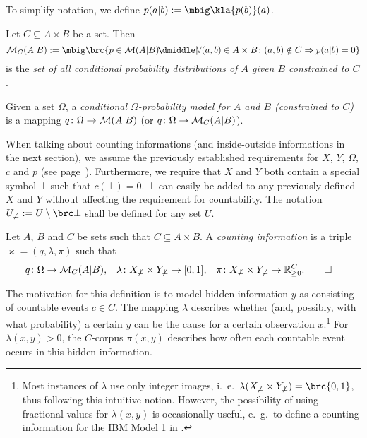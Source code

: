 To simplify notation, we define $p(a|b) := \mbig\kla{p(b)}(a)$.

\begin{definition}\label{def:02-cpd-restr}
 Let $C\subseteq A\times B$ be a set. Then
 \[
  \um_C(A|B) := \mbig\brc{p\in\um(A|B)\!\dmiddle|\! \forall (a,b)\in A\times B\colon (a,b)\notin C \Rightarrow p(a|b) = 0}
 \]
is the \emph{set of all conditional probability distributions of $A$ given $B$
 constrained to $C$}.
\end{definition}

\begin{definition}
 Given a set $\Omega$, a \emph{conditional $\Omega$-probability model for $A$
 and $B$ (constrained to $C$)} is a mapping $q\colon\Omega\to\mathcal M(A|B)$ (or
 $q\colon\Omega\to\mathcal M_C(A|B)$).
\end{definition}

When talking about counting informations (and inside-outside informations in
the next section), we assume the previously established requirements for $X$,
$Y$, $\Omega$, $c$ and $p$ (see page~\pageref{02-basic-requirements}).
Furthermore, we require that $X$ and $Y$ both contain a special symbol $\bot$
such that $c(\bot) = 0$. $\bot$ can easily be
added to any previously defined $X$ and $Y$ without affecting the requirement
for countability. The notation $U_{\not\bot} := U\setminus\brc\bot$ shall be
defined for any set $U$.

\begin{definition}
 Let $A$, $B$ and $C$ be sets such that $C\subseteq A\times B$. A
 \emph{counting information} is a triple $\varkappa = (q,\lambda,\pi)$ such
 that
 \begin{align*}
  q &\colon \Omega\to\mathcal M_C(A|B), &
  \lambda &\colon X_{\not\bot} \times Y_{\not\bot} \to [0,1], &
  \pi &\colon X_{\not\bot} \times Y_{\not\bot} \to \mathbb R_{\geq0}^C.
  \qedhere
 \end{align*}
\end{definition}

The motivation for this definition is to model hidden information $y$ as
consisting of countable events $c\in C$. The mapping $\lambda$ describes
whether (and, possibly, with what probability) a certain $y$ can be the cause
for a certain observation $x$.\footnote{Most instances of $\lambda$ use only
integer images, i.~e.~$\lambda(X_{\not\bot}\times Y_{\not\bot}) = \brc{0,1}$,
thus following this intuitive notion. However, the possibility of using
fractional values for $\lambda(x,y)$ is occasionally useful, e.~g.~to define a
counting information for the IBM Model 1 in \cite[pp.~23]{bucstuvog15}.} For
$\lambda(x,y)>0$, the $C$-corpus $\pi(x,y)$ describes how often each countable
event occurs in this hidden information.

